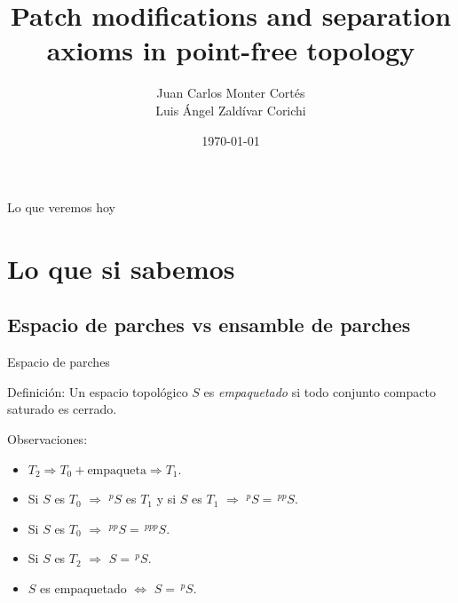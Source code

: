 \documentclass[compress,12pt]{beamer}
\title{Patch modifications and separation axioms in point-free topology}
\date{\today}
\author{Juan Carlos Monter Cortés\\ Luis Ángel Zaldívar Corichi}
\institute{Universidad de Guadalajara}
\begin{document}
\frame[plain]{\titlepage}

\begin{frame}{Lo que veremos hoy \smiley}
\tableofcontents %
\end{frame}

\section{Lo que si sabemos}
\subsection{Espacio de parches vs ensamble de parches}
\begin{frame}{Espacio de parches}
		
		\begin{block}{Definición:}
			Un espacio topológico $S$ es \emph{empaquetado} si todo conjunto compacto saturado es cerrado.
		\end{block}


   
		
\end{frame}

\begin{frame}
\begin{block}{Observaciones:}
\begin{itemize}
\item $T_2\Rightarrow T_0+\mbox{empaqueta}\Rightarrow T_1$.
\item<2-> Si $S$ es $T_0$ $\Rightarrow$ $^pS$ es $T_1$ y si $S$ es $T_1$ $\Rightarrow$ $^pS=\,^{pp}S$.
\item<3-> Si $S$ es $T_0$ $\Rightarrow$ $^{pp}S=\,^{ppp}S$.
\item<4-> Si $S$ es $T_2$ $\Rightarrow$ $S=\,^pS$.
\item<5-> $S$ es empaquetado $\Leftrightarrow$ $S=\,^pS$. 
\end{itemize}
\end{block}

\end{frame}
\end{document}
